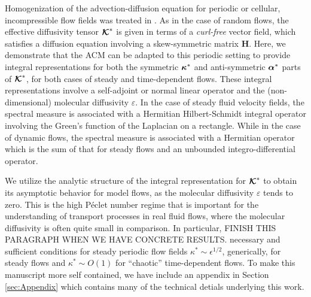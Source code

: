 \documentclass[11pt]{amsart}
\newcommand{\Hb}{\mathbf{H}}
\newcommand\Kbc{\mbox{\boldmath${\mathcal{K}}$}}
\newcommand\balpha{\mbox{\boldmath${\alpha}$}}
\newcommand\bkappa{\mbox{\boldmath${\kappa}$}}
\begin{document}
Homogenization of the advection-diffusion equation for periodic or
cellular, incompressible flow fields was treated in
\cite{Fannjiang:SIAM_JAM:333,Fannjiang:1997:1033}. As in the case of
random flows, the effective diffusivity tensor
$\Kbc^*$ is given in terms of a \emph{curl-free} vector field, which
satisfies a diffusion equation involving a skew-symmetric
matrix $\Hb$. Here, we demonstrate that the ACM can
be adapted to this periodic setting to provide integral
representations for both the symmetric $\bkappa^*$ and 
anti-symmetric $\balpha^*$ parts of $\Kbc^*$, for both cases of
steady and time-dependent flows. These integral representations
involve a self-adjoint or normal linear operator and the
(non-dimensional) molecular diffusivity $\varepsilon$. In the case of steady
fluid velocity fields, the spectral measure is associated with a
Hermitian Hilbert-Schmidt integral operator involving the Green's
function of the Laplacian on a rectangle. While in the case of dynamic 
flows, the spectral measure is associated with a Hermitian operator
which is the sum of that for steady flows and an unbounded
integro-differential operator.      
 

We utilize the analytic structure of the  integral
representation for $\Kbc^*$ to obtain its asymptotic behavior for
model flows, as the molecular diffusivity $\varepsilon$ tends to zero. This is
the high P\'{e}clet number regime that is important for the
understanding of transport processes in real fluid flows, where the
molecular diffusivity is often quite small in comparison. In
particular, FINISH THIS PARAGRAPH WHEN WE HAVE CONCRETE RESULTS.
necessary and sufficient conditions for steady periodic flow
fields $\kappa^*\sim\epsilon^{1/2}$, generically, for steady flows and $\kappa^*\sim O(1)$ for
``chaotic'' time-dependent flows. To make this manuscript more self
contained, we have include an appendix in Section \ref{sec:Appendix}
which contains many of the technical detials underlying this work.

%
\end{document}
